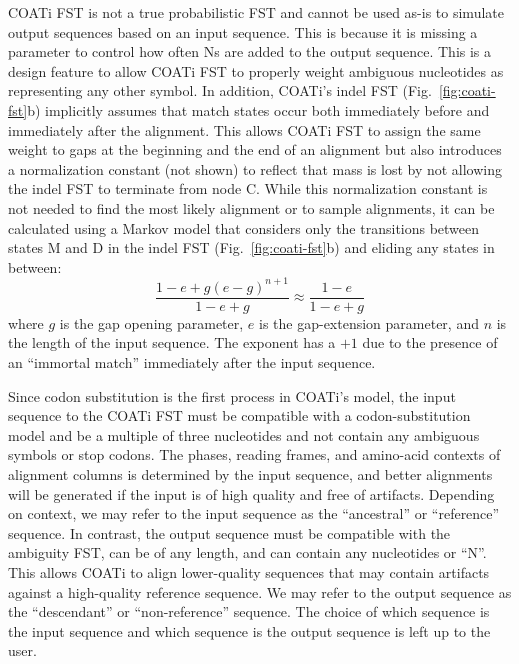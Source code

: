 \documentclass[12pt,letterpaper]{article}
\begin{document}
COATi FST is not a true probabilistic FST \citep{cotterell-etal-2014-stochastic} and cannot be used as-is to simulate output sequences based on an input sequence. This is because it is missing a parameter to control how often Ns are added to the output sequence. This is a design feature to allow COATi FST to properly weight ambiguous nucleotides as representing any other symbol. In addition, COATi's indel FST (Fig.~\ref{fig:coati-fst}b) implicitly assumes that match states occur both immediately before and immediately after the alignment. This allows COATi FST to assign the same weight to gaps at the beginning and the end of an alignment but also introduces a normalization constant (not shown) to reflect that mass is lost by not allowing the indel FST to terminate from node C. While this normalization constant is not needed to find the most likely alignment or to sample alignments, it can be calculated using a Markov model that considers only the transitions between states M and D in the indel FST (Fig.~\ref{fig:coati-fst}b) and eliding any states in between:
\[
\frac{1-e + g(e-g)^{n+1}}{1-e+g} \approx \frac{1-e}{1-e+g} 
\]
where $g$ is the gap opening parameter, $e$ is the gap-extension parameter, and $n$ is the length of the input sequence. The exponent has a $+1$ due to the presence of an ``immortal match'' immediately after the input sequence.

Since codon substitution is the first process in COATi's model, the input sequence to the COATi FST must be compatible with a codon-substitution model and be a multiple of three nucleotides and not contain any ambiguous symbols or stop codons. The phases, reading frames, and amino-acid contexts of alignment columns is determined by the input sequence, and better alignments will be generated if the input is of high quality and free of artifacts. Depending on context, we may refer to the input sequence as the ``ancestral'' or ``reference'' sequence. In contrast, the output sequence must be compatible with the ambiguity FST, can be of any length, and can contain any nucleotides or ``N''. This allows COATi to align lower-quality sequences that may contain artifacts against a high-quality reference sequence. We may refer to the output sequence as the ``descendant'' or ``non-reference'' sequence. The choice of which sequence is the input sequence and which sequence is the output sequence is left up to the user.
\end{document}
